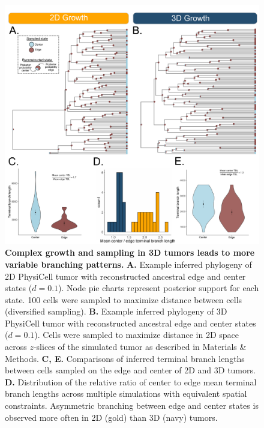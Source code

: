 \documentclass[12pt]{elife_based}
\begin{document}
\begin{figure}
\includegraphics[width=\textwidth]{figures/figure_2_supp_dim_comparison.pdf}
\caption{\textbf{Complex growth and sampling in 3D tumors leads to more variable branching patterns.} \textbf{A.} Example inferred phylogeny of 2D PhysiCell tumor with reconstructed ancestral edge and center states ($d = 0.1$). Node pie charts represent posterior support for each state. 100 cells were sampled to maximize distance between cells (diversified sampling). \textbf{B.} Example inferred phylogeny of 3D PhysiCell tumor with reconstructed ancestral edge and center states ($d = 0.1$). Cells were sampled to maximize distance in 2D space across $z$-slices of the simulated tumor as described in Materials \& Methods. \textbf{C, E.} Comparisons of inferred terminal branch lengths between cells sampled on the edge and center of 2D and 3D tumors. \textbf{D.} Distribution of the relative ratio of center to edge mean terminal branch lengths across multiple simulations with equivalent spatial constraints. Asymmetric branching between edge and center states is observed more often in 2D (gold) than 3D (navy) tumors.}
\label{figsupp:sf4-1}
\end{figure} 
\end{document}
